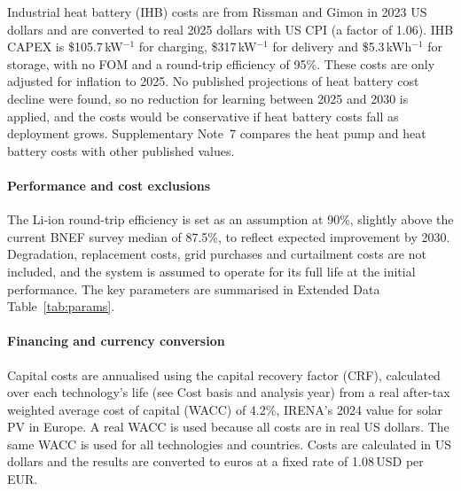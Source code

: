 \documentclass[11pt]{article}
\begin{document}
Industrial heat battery (IHB) costs are from Rissman and Gimon\cite{rissman2023ihb} in 2023 US dollars and are converted to real 2025 dollars with US CPI (a factor of 1.06). IHB CAPEX is \$105.7\,kW$^{-1}$ for charging, \$317\,kW$^{-1}$ for delivery and \$5.3\,kWh$^{-1}$ for storage, with no FOM and a round-trip efficiency of 95\%\cite{rissman2023ihb}. These costs are only adjusted for inflation to 2025. No published projections of heat battery cost decline were found, so no reduction for learning between 2025 and 2030 is applied, and the costs would be conservative if heat battery costs fall as deployment grows. Supplementary Note~7 compares the heat pump and heat battery costs with other published values.

\paragraph*{Performance and cost exclusions}
The Li-ion round-trip efficiency is set as an assumption at 90\%, slightly above the current BNEF survey median of 87.5\%, to reflect expected improvement by 2030. Degradation, replacement costs, grid purchases and curtailment costs are not included, and the system is assumed to operate for its full life at the initial performance. The key parameters are summarised in Extended Data Table~\ref{tab:params}.

\paragraph*{Financing and currency conversion}
Capital costs are annualised using the capital recovery factor (CRF), calculated over each technology's life (see Cost basis and analysis year) from a real after-tax weighted average cost of capital (WACC) of 4.2\%, IRENA's 2024 value for solar PV in Europe\cite{irena2025}. A real WACC is used because all costs are in real US dollars. The same WACC is used for all technologies and countries. Costs are calculated in US dollars and the results are converted to euros at a fixed rate of 1.08\,USD per EUR.
\end{document}
